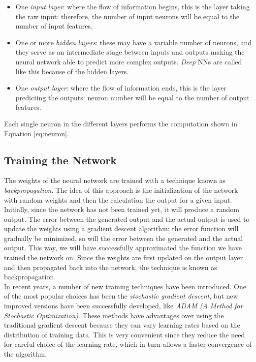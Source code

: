 \begin{itemize}
	\item One \textit {input layer}: where the flow of information begins, this is the layer taking the raw input: therefore, the number of input neurons will be equal to the number of input features.
	\item One or more \textit{hidden layers}: these may have a variable number of neurons, and they serve as an intermediate stage between inputs and outputs making the neural network able to predict more complex outputs. \textit{Deep} NNs are called like this because of the hidden layers.
	\item One \textit{output layer}: where the flow of information ends, this is the layer predicting the outputs: neuron number will be equal to the number of output features.
\end{itemize}

Each single neuron in the different layers performs the computation shown in Equation \ref{eq:neuron}.

\subsection{Training the Network}
\label{subsec:traininnet}

The weights of the neural network are trained with a technique known as \textit{backpropagation}. The idea of this approach is the initialization of the network with random weights and then the calculation the output for a given input. Initially, since the network has not been trained yet, it will produce a random output. The error between the generated output and the actual output is used to update the weights using a gradient descent algorithm: the error function will gradually be minimized, so will the error between the generated and the actual output. This way, we will have successfully approximated the function we have trained the network on. Since the weights are first updated on the output layer and then propagated back into the network, the technique is known as backpropagation.
\\
\indent In recent years, a number of new training techniques have been introduced. One of the most popular choices has been the \textit{stochastic gradient descent}, but new improved versions have been successfully developed, like \textit{ADAM (A Method for Stochastic Optimization)}\cite{kingma2014adam}. These methods have advantages over using the traditional gradient descent because they can vary learning rates based on the distribution of training data. This is very convenient since they reduce the need for careful choice of the learning rate, which in turn allows a faster convergence of the algorithm.

